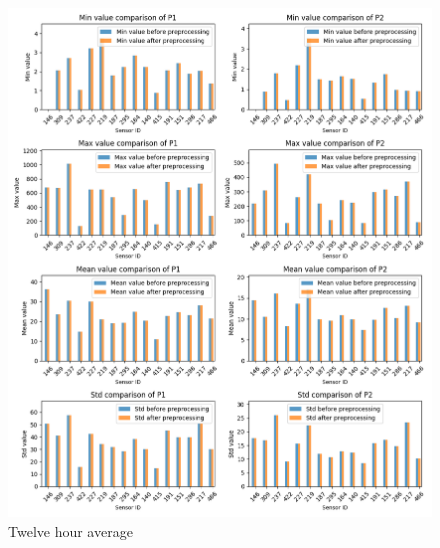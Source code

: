 \documentclass[12pt,a4paper,twoside]{scrartcl}
\numberwithin{equation}{section}
\newcounter{mypagecount}%
\newenvironment{interlude}{%
  \clearpage
  \setcounter{mypagecount}{\value{page}}%
  \thispagestyle{empty}%
  \pagestyle{empty}%
  }{%
  \clearpage
  \setcounter{page}{\value{mypagecount}}%
  }
\begin{document}
\begin{interlude}
\begin{appendices}
\begin{center}
      \begin{figure}[H]
        \centerline{\includegraphics[width=1.1\textwidth,height=1.3\textwidth]{figures/12H_sensor_metrics}}
        \caption[Metrics change during preprocessing (twelve hour average)]{Twelve hour average}
      \end{figure}


\end{center}
\end{appendices}
\end{interlude}
\end{document}
